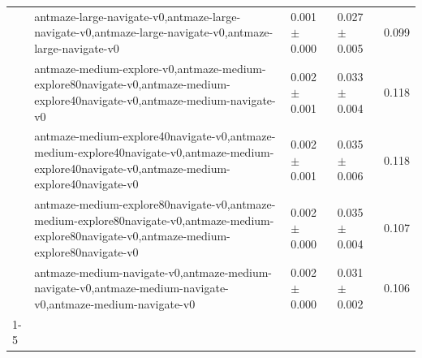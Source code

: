 \begin{tabular}{lllll}
 & antmaze-large-navigate-v0,antmaze-large-navigate-v0,antmaze-large-navigate-v0,antmaze-large-navigate-v0 & 0.001 $\pm$ 0.000 & 0.027 $\pm$ 0.005 & 0.099 \\
 & antmaze-medium-explore-v0,antmaze-medium-explore80navigate-v0,antmaze-medium-explore40navigate-v0,antmaze-medium-navigate-v0 & 0.002 $\pm$ 0.001 & 0.033 $\pm$ 0.004 & 0.118 \\
 & antmaze-medium-explore40navigate-v0,antmaze-medium-explore40navigate-v0,antmaze-medium-explore40navigate-v0,antmaze-medium-explore40navigate-v0 & 0.002 $\pm$ 0.001 & 0.035 $\pm$ 0.006 & 0.118 \\
 & antmaze-medium-explore80navigate-v0,antmaze-medium-explore80navigate-v0,antmaze-medium-explore80navigate-v0,antmaze-medium-explore80navigate-v0 & 0.002 $\pm$ 0.000 & 0.035 $\pm$ 0.004 & 0.107 \\
 & antmaze-medium-navigate-v0,antmaze-medium-navigate-v0,antmaze-medium-navigate-v0,antmaze-medium-navigate-v0 & 0.002 $\pm$ 0.000 & 0.031 $\pm$ 0.002 & 0.106 \\
\cline{1-5}
\bottomrule
\end{tabular}
